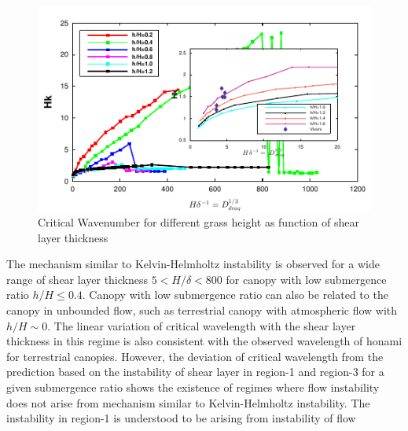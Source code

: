 \documentclass[aps,prl,twocolumn,showpacs,superscriptaddress,groupedaddress,10pt]{revtex4-1}  %
\begin{document}
\begin{figure}[htb]
\includegraphics[]{K_vs_shear_width_noshear}
\caption{Critical Wavenumber for different grass height as function of shear layer thickness}
\label{K_vs_shear}
\end{figure}
\newline
The mechanism similar to Kelvin-Helmholtz instability is observed for a wide range of shear layer thickness $5 <H/\delta <800$ for canopy with low submergence ratio $h/H\leq 0.4$.
Canopy with low submergence ratio can also be related to the canopy in unbounded flow, such as terrestrial canopy with atmospheric flow with $h/H\sim 0$. 
The linear variation of critical wavelength with the shear layer thickness in this regime is also consistent with the observed wavelength of honami for terrestrial canopies.
However, the deviation of critical wavelength from the prediction based on the instability of shear layer in region-1 and region-3 for a given submergence ratio shows the existence of 
regimes where flow instability does not arise from mechanism similar to Kelvin-Helmholtz instability. The instability in region-1 is understood to be arising from instability of flow
\end{document}
